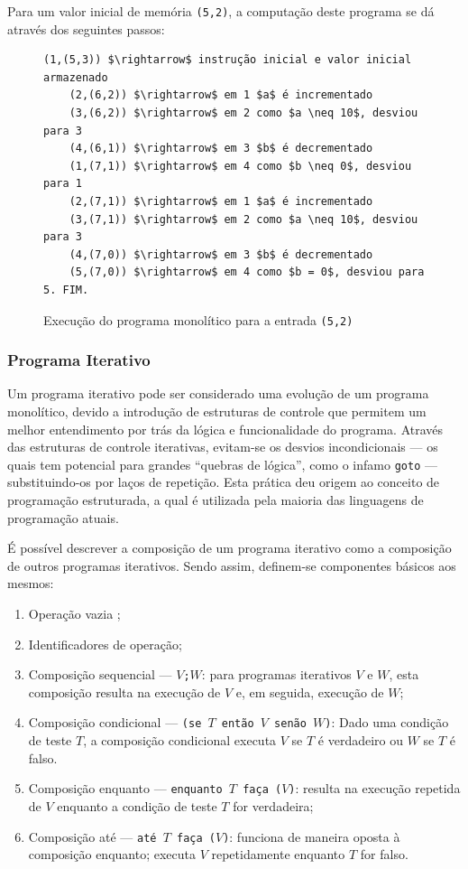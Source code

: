 \documentclass[12pt,fleqn]{article}
\begin{document}
\noindent
Para um valor inicial de memória \verb|(5,2)|, a computação deste programa se dá
através dos seguintes passos:

\begin{figure}[H]
\begin{Verbatim}[commandchars=\\\{\},codes={\catcode`\$=3\catcode`\^=7}]
    (1,(5,3)) $\rightarrow$ instrução inicial e valor inicial armazenado
    (2,(6,2)) $\rightarrow$ em 1 $a$ é incrementado
    (3,(6,2)) $\rightarrow$ em 2 como $a \neq 10$, desviou para 3
    (4,(6,1)) $\rightarrow$ em 3 $b$ é decrementado
    (1,(7,1)) $\rightarrow$ em 4 como $b \neq 0$, desviou para 1
    (2,(7,1)) $\rightarrow$ em 1 $a$ é incrementado
    (3,(7,1)) $\rightarrow$ em 2 como $a \neq 10$, desviou para 3
    (4,(7,0)) $\rightarrow$ em 3 $b$ é decrementado
    (5,(7,0)) $\rightarrow$ em 4 como $b = 0$, desviou para 5. FIM.
\end{Verbatim}
\caption{Execução do programa monolítico para a entrada \texttt{(5,2)}}
\end{figure}


\subsubsection{Programa Iterativo}
Um programa iterativo pode ser considerado uma evolução de um programa
monolítico, devido a introdução de estruturas de controle que permitem um
melhor entendimento por trás da lógica e funcionalidade do programa. Através
das estruturas de controle iterativas, evitam-se os desvios incondicionais ---
os quais tem potencial para grandes ``quebras de lógica'', como o infamo
\verb|goto| --- substituindo-os por laços de repetição. Esta prática deu origem
ao conceito de programação estruturada, a qual é utilizada pela maioria das
linguagens de programação atuais.

É possível descrever a composição de um programa iterativo como a composição de
outros programas iterativos. Sendo assim, definem-se componentes básicos aos
mesmos:

\begin{enumerate}
    \item Operação vazia \checkmark;
    \item Identificadores de operação;
    \item Composição sequencial --- \texttt{$V$;$W$}: para programas iterativos
    $V$ e $W$, esta composição resulta na execução de $V$ e, em seguida,
    execução de $W$;
    \item Composição condicional --- \texttt{(se $T$ então $V$ senão $W$)}:
    Dado uma condição de teste $T$, a composição condicional executa $V$ se $T$
    é verdadeiro ou $W$ se $T$ é falso.
    \item Composição enquanto --- \texttt{enquanto $T$ faça  ($V$)}: resulta na
    execução repetida de $V$ enquanto a condição de teste $T$ for verdadeira;
    \item Composição até --- \texttt{até $T$ faça ($V$)}: funciona de maneira
    oposta à composição enquanto; executa $V$ repetidamente enquanto $T$ for
    falso.
\end{enumerate}
\end{document}

